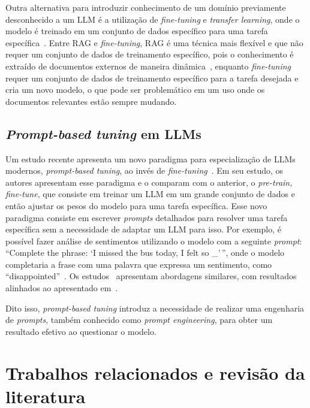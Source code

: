 \documentclass[journal]{IEEEtran}
\begin{document}
Outra alternativa para introduzir conhecimento de um domínio previamente desconhecido a um LLM é a utilização de \textit{fine-tuning} e \textit{transfer learning}, onde o modelo é treinado em um conjunto de dados específico para uma tarefa específica~\cite{vaswani2017attention,devlin2018bert}.
Entre RAG e \textit{fine-tuning}, RAG é uma técnica mais flexível e que não requer um conjunto de dados de treinamento específico, pois o conhecimento é extraído de documentos externos de maneira dinâmica~\cite{lewis2020retrieval}, enquanto \textit{fine-tuning} requer um conjunto de dados de treinamento específico para a tarefa desejada e cria um novo modelo, o que pode ser problemático em um uso onde os documentos relevantes estão sempre mudando.

\subsection{\textit{Prompt-based tuning} em LLMs}

\noindent%
Um estudo recente apresenta um novo paradigma para especialização de LLMs modernos, \textit{prompt-based tuning}, ao invés de \textit{fine-tuning}~\cite{liu2023pre}.
Em seu estudo, os autores apresentam esse paradigma e o comparam com o anterior, o \textit{pre-train, fine-tune}, que consiste em treinar um LLM em um grande conjunto de dados e então ajustar os pesos do modelo para uma tarefa específica.
Esse novo paradigma consiste em escrever \textit{prompts} detalhados para resolver uma tarefa específica sem a necessidade de adaptar um LLM para isso.
Por exemplo, é possível fazer análise de sentimentos utilizando o modelo com a seguinte \textit{prompt}: ``Complete the phrase: `I missed the bus today, I felt so \_'\,'', onde o modelo completaria a frase com uma palavra que expressa um sentimento, como ``disappointed''~\cite{liu2023pre}.
Os estudos~\cite{wei2022finetunedlanguagemodelszeroshot,kong2023better} apresentam abordagens similares, com resultados alinhados ao apresentado em~\cite{liu2023pre}.

Dito isso, \textit{prompt-based tuning} introduz a necessidade de realizar uma engenharia de \textit{prompts}, também conhecido como \textit{prompt engineering}, para obter um resultado efetivo ao questionar o modelo.

\section{Trabalhos relacionados e revisão da literatura\label{sec:trab_rel}}
\end{document}
